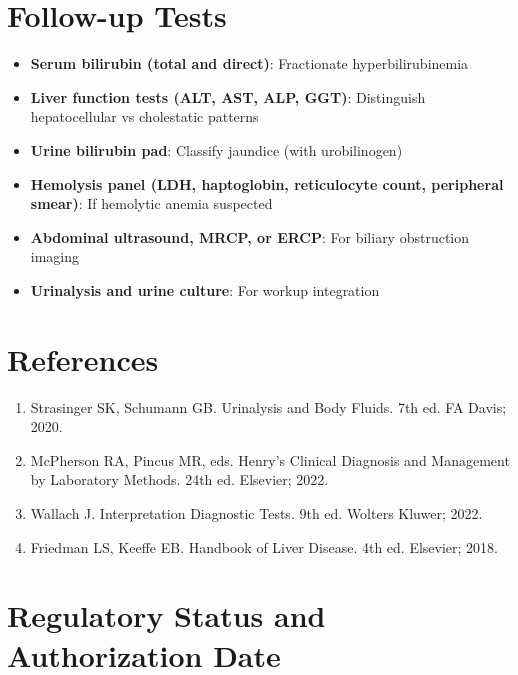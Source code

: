 \section*{Follow-up Tests}
\begin{itemize}
  \item \textbf{Serum bilirubin (total and direct)}: Fractionate hyperbilirubinemia
  \item \textbf{Liver function tests (ALT, AST, ALP, GGT)}: Distinguish hepatocellular vs cholestatic patterns
  \item \textbf{Urine bilirubin pad}: Classify jaundice (with urobilinogen)
  \item \textbf{Hemolysis panel (LDH, haptoglobin, reticulocyte count, peripheral smear)}: If hemolytic anemia suspected
  \item \textbf{Abdominal ultrasound, MRCP, or ERCP}: For biliary obstruction imaging
  \item \textbf{Urinalysis and urine culture}: For workup integration
\end{itemize}

\section*{References}
\begin{enumerate}
  \item Strasinger SK, Schumann GB. Urinalysis and Body Fluids. 7th ed. FA Davis; 2020.
  \item McPherson RA, Pincus MR, eds. Henry's Clinical Diagnosis and Management by Laboratory Methods. 24th ed. Elsevier; 2022.
  \item Wallach J. Interpretation Diagnostic Tests. 9th ed. Wolters Kluwer; 2022.
  \item Friedman LS, Keeffe EB. Handbook of Liver Disease. 4th ed. Elsevier; 2018.
\end{enumerate}

\clearpage
\section*{Regulatory Status and Authorization Date}

\clearpage

